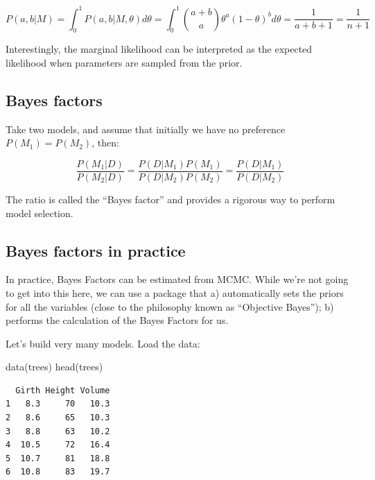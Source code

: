 \documentclass[
  letterpaper,
  DIV=11,
  numbers=noendperiod]{scrreprt}
\newenvironment{Shaded}{\begin{snugshade}}{\end{snugshade}}
\newcommand{\DecValTok}[1]{\textcolor[rgb]{0.68,0.00,0.00}{#1}}
\newcommand{\FunctionTok}[1]{\textcolor[rgb]{0.28,0.35,0.67}{#1}}
\newcommand{\NormalTok}[1]{\textcolor[rgb]{0.00,0.23,0.31}{#1}}
\newcommand{\OtherTok}[1]{\textcolor[rgb]{0.00,0.23,0.31}{#1}}
\newcommand{\SpecialCharTok}[1]{\textcolor[rgb]{0.37,0.37,0.37}{#1}}
\begin{document}
\[
P(a,b\vert M) = \int_0^1 P(a,b\vert M,\theta) d\theta = \int_0^1 \binom{a+b}{a} \theta^{a} (1-\theta)^{b} d\theta  = \frac{1}{a+b+1} = \frac{1}{n+1}
\]

Interestingly, the marginal likelihood can be interpreted as the
expected likelihood when parameters are sampled from the prior.

\hypertarget{bayes-factors}{%
\subsection{Bayes factors}\label{bayes-factors}}

Take two models, and assume that initially we have no preference
\(P(M_1) = P(M_2)\), then:

\[
  \frac{P(M_1\vert D)}{P(M_2\vert D)} = \frac{P(D\vert M_1)P(M_1)}{P(D\vert M_2)P(M_2)} = \frac{P(D\vert M_1)}{P(D\vert M_2)}
\]

The ratio is called the ``Bayes factor'' and provides a rigorous way to
perform model selection.

\hypertarget{bayes-factors-in-practice}{%
\subsection{Bayes factors in practice}\label{bayes-factors-in-practice}}

In practice, Bayes Factors can be estimated from MCMC. While we're not
going to get into this here, we can use a package that a) automatically
sets the priors for all the variables (close to the philosophy known as
``Objective Bayes''); b) performs the calculation of the Bayes Factors
for us.

Let's build very many models. Load the data:

\begin{Shaded}
\begin{Highlighting}[]
\FunctionTok{data}\NormalTok{(trees)}
\FunctionTok{head}\NormalTok{(trees)}
\end{Highlighting}
\end{Shaded}

\begin{verbatim}
  Girth Height Volume
1   8.3     70   10.3
2   8.6     65   10.3
3   8.8     63   10.2
4  10.5     72   16.4
5  10.7     81   18.8
6  10.8     83   19.7
\end{verbatim}

\begin{Shaded}
\end{Shaded}
\end{document}
